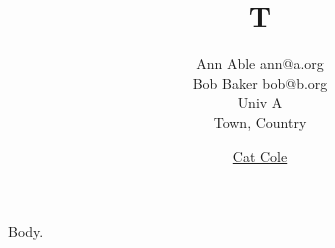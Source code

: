 \documentclass{revtex4-1}
\begin{document}
\title{T}
\author{Ann Able ann@a.org\\ Bob Baker bob@b.org\\ Univ A\\ Town, Country}
\author{\href{https://orcid.org/0000-0001-5935-6018}{Cat Cole}}
\maketitle
Body.
\end{document}
